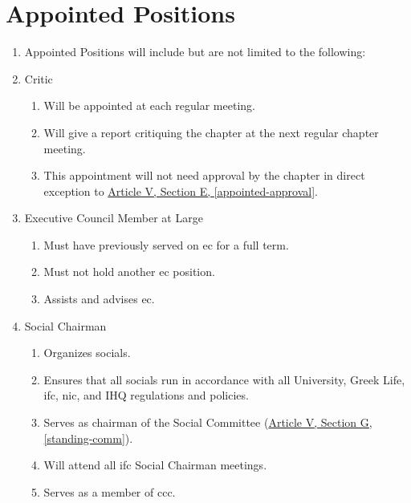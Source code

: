 \section{Appointed Positions}
	\begin{enumerate}
		\item Appointed Positions will include but are not limited to the following:
				\item Critic
					\begin{enumerate}
						\item Will be appointed at each regular meeting.
						\item Will give a report critiquing the chapter at the next regular chapter meeting.
						\item This appointment will not need approval by the chapter in direct exception to \hyperref[appointed-approval]{Article V, Section E, \autoref*{appointed-approval}}.
					\end{enumerate}

                \item Executive Council Member at Large
					\begin{enumerate}
						\item Must have previously served on \gls{ec} for a full term.
						\item Must not hold another \gls{ec} position.
						\item Assists and advises \gls{ec}.
					\end{enumerate}

				\item Social Chairman
					\begin{enumerate}
						\item Organizes \glspl{social}.
						\item Ensures that all \glspl{social} run in accordance with all University, Greek Life, \gls{ifc}, \gls{nic}, and IHQ regulations and policies.
						\item Serves as chairman of the Social Committee (\hyperref[standing-comm]{Article V, Section G, \autoref*{standing-comm}}).
						\item Will attend all \gls{ifc} Social Chairman meetings.
						\item Serves as a member of \gls{ccc}.
					\end{enumerate}


\end{enumerate}
